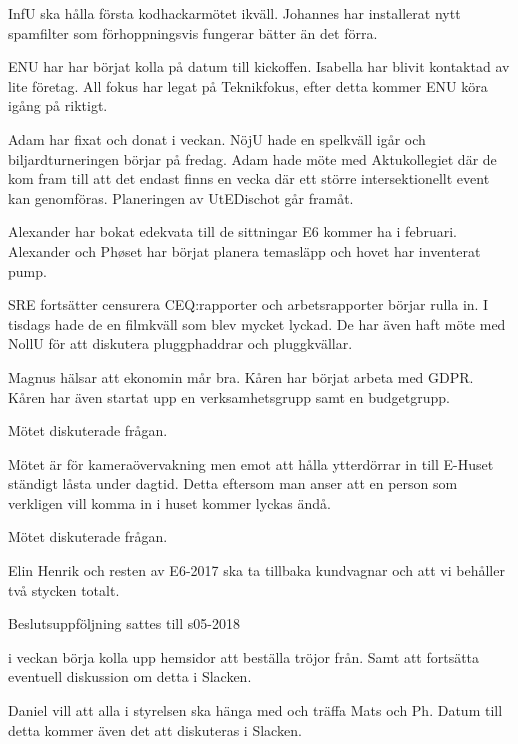 \documentclass[10pt]{article}
\begin{document}
\begin{paragrafer}
\begin{paragrafer}
  InfU ska hålla första kodhackarmötet ikväll. Johannes har installerat nytt spamfilter som förhoppningsvis fungerar bätter än det förra.

  ENU har har börjat kolla på datum till kickoffen. Isabella har blivit kontaktad av lite företag. All fokus har legat på Teknikfokus, efter detta kommer ENU köra igång på riktigt.

  Adam har fixat och donat i veckan. NöjU hade en spelkväll igår och biljardturneringen börjar på fredag. Adam hade möte med Aktukollegiet där de kom fram till att det endast finns en vecka där ett större intersektionellt event kan genomföras. Planeringen av UtEDischot går framåt.

  Alexander har bokat edekvata till de sittningar E6 kommer ha i februari. Alexander och Phøset har börjat planera temasläpp och hovet har inventerat pump.

  SRE fortsätter censurera CEQ:rapporter och arbetsrapporter börjar rulla in. I tisdags hade de en filmkväll som blev mycket lyckad. De har även haft möte med NollU för att diskutera pluggphaddrar och pluggkvällar.

  Magnus hälsar att ekonomin mår bra.
  Kåren har börjat arbeta med GDPR. Kåren har även startat upp en verksamhetsgrupp samt en budgetgrupp.
\end{paragrafer}

  Mötet diskuterade frågan.

  Mötet är för kameraövervakning men emot att hålla ytterdörrar in till E-Huset ständigt låsta under dagtid. Detta eftersom man anser att en person som verkligen vill komma in i huset kommer lyckas ändå.

  Mötet diskuterade frågan.

  Elin \ypa Henrik och resten av E6-2017 ska ta tillbaka kundvagnar och att vi behåller två stycken totalt.

  \Mbaby

  Beslutsuppföljning sattes till s05-2018

  \Mba i veckan börja kolla upp hemsidor att beställa tröjor från. Samt att fortsätta eventuell diskussion om detta i Slacken.


  Daniel vill att alla i styrelsen ska hänga med och träffa Mats och Ph. Datum till detta kommer även det att diskuteras i Slacken.


\end{paragrafer}
\end{document}
